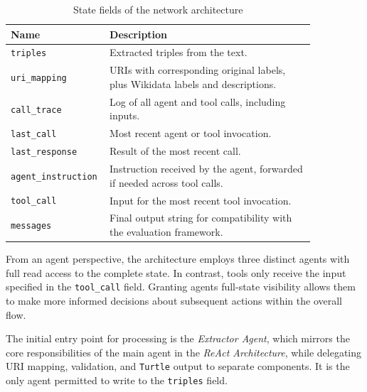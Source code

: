 \documentclass[a4paper,oneside,bibliography=totoc]{scrbook}
\begin{document}
\begin{table}[h!]
  \centering
  \caption{State fields of the network architecture}
  \label{tab:network_state}
  \begin{tabular}{p{0.2\linewidth}p{0.65\linewidth}}
    \toprule
    \textbf{Name}               & \textbf{Description}                                                                 \\
    \midrule
    \texttt{triples}            & Extracted triples from the text.                                                     \\
    \texttt{uri\_mapping}       & \acp{URI} with corresponding original labels, plus Wikidata labels and descriptions. \\
    \texttt{call\_trace}        & Log of all agent and tool calls, including inputs.                                   \\
    \texttt{last\_call}         & Most recent agent or tool invocation.                                                \\
    \texttt{last\_response}     & Result of the most recent call.                                                      \\
    \texttt{agent\_instruction} & Instruction received by the agent, forwarded if needed across tool calls.            \\
    \texttt{tool\_call}         & Input for the most recent tool invocation.                                           \\
    \texttt{messages}           & Final output string for compatibility with the evaluation framework.                 \\
    \bottomrule
  \end{tabular}
\end{table}

From an agent perspective, the architecture employs three distinct agents with full read access to the complete state. In contrast, tools only receive the input specified in the \texttt{tool\_call} field. Granting agents full-state visibility allows them to make more informed decisions about subsequent actions within the overall flow.

The initial entry point for processing is the \textit{Extractor Agent}, which mirrors the core responsibilities of the main agent in the \textit{ReAct Architecture}, while delegating \ac{URI} mapping, validation, and \texttt{Turtle} output to separate components. It is the only agent permitted to write to the \texttt{triples} field.
\end{document}
